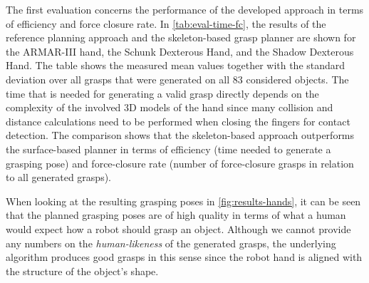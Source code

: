 The first evaluation concerns the performance of the developed approach in terms of efficiency and force closure rate. In \autoref{tab:eval-time-fc}, the results of the reference planning approach and the skeleton-based grasp planner are shown for the ARMAR-III hand, the Schunk Dexterous Hand, and the Shadow Dexterous Hand. 
The table shows the measured mean values together with the standard deviation over all grasps that were generated on all 83 considered objects. 
The time that is needed for generating a valid grasp directly depends on the complexity of the involved 3D models of the hand since many collision and distance calculations need to be performed when closing the fingers for contact detection.
The comparison shows that the skeleton-based approach outperforms the surface-based planner in terms of efficiency (time needed to generate a grasping pose) and force-closure rate (number of force-closure grasps in relation to all generated grasps). 

When looking at the resulting grasping poses in \autoref{fig:results-hands}, it can be seen that the planned grasping poses are of high quality in terms of what a human would expect how a robot should grasp an object.
Although we cannot provide any numbers on the \textit{human-likeness} of the generated grasps, the underlying algorithm produces good grasps in this sense since the robot hand is aligned with the structure of the object's shape.



